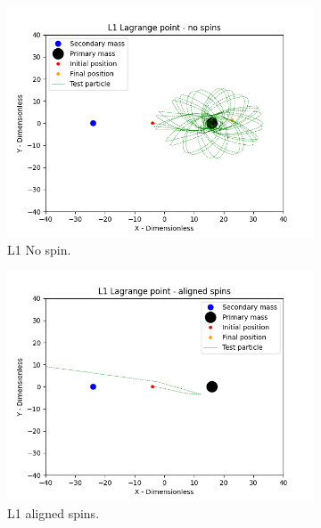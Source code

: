 \documentclass{article}
\begin{document}
\begin{figure}
    \centering
    \begin{subfigure}[b]{0.3\textwidth}
         \centering
         \includegraphics[width=\textwidth]{images/L1 no spin.png}
         \caption{L1 No spin.}
         \label{fig:L1 no spin}
     \end{subfigure}
    \begin{subfigure}[b]{0.3\textwidth}
         \centering
         \includegraphics[width=\textwidth]{images/L1 aligned spins.png}
         \caption{L1 aligned spins.}
         \label{fig:L1 aligned spins}
     \end{subfigure}
    \begin{subfigure}[b]{0.3\textwidth}

\end{subfigure}
\end{figure}
\end{document}
